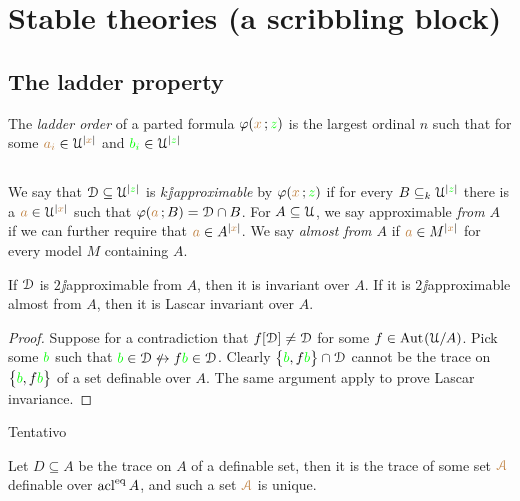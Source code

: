 \documentclass[creche.tex]{subfiles}
\begin{document}
\chapter{Stable theories (a scribbling block)}
\label{stability}
 
\def\medrel#1{\parbox[t]{6ex}{$\displaystyle\hfil #1$}}
\def\ceq#1#2#3{\parbox{25ex}{$\displaystyle #1$}\medrel{#2}$\displaystyle  #3$}

\section{The ladder property}

The \emph{ladder order\/} of a parted formula $\varphi({\color{brown} x}\,;{\color{green} z})$ is the largest ordinal $n$ such that for some ${\color{brown} a_i}\in\EuScript U^{|{\color{brown} x}|}$ and ${\color{green} b_i}\in\EuScript U^{|{\color{green} z}|}$ 


\section{}

We say that $\EuScript D\subseteq\EuScript U^{|{\color{green} z}|}$ is \emph{$k\jj$approximable\/} by $\varphi({\color{brown} x}\,;{\color{green} z})$ if for every $B\subseteq_k\EuScript U^{|{\color{green} z}|}$ there is a ${\color{brown} a}\in\EuScript U^{|{\color{brown} x}|}$ such that $\varphi({\color{brown} a}\,;B)=\EuScript D\cap B$. For $A\subseteq\EuScript U$, we say approximable \emph{from $A$\/} if we can further require that ${\color{brown} a}\in A^{|{\color{brown} x}|}$. We say \emph{almost from $A$\/} if  ${\color{brown} a}\in M^{|{\color{brown} x}|}$ for every model $M$ containing $A$.

\begin{proposition}
If\/ $\EuScript D$ is\/ $2\jj$approximable from $A$, then it is invariant over $A$. If it is\/ $2\jj$ap\-prox\-i\-ma\-ble almost from $A$, then it is Lascar invariant over $A$.
\end{proposition}

\begin{proof}
Suppose for a contradiction that $f[\EuScript D]\neq\EuScript D$ for some $f\in\textrm{Aut\kern.15ex}(\EuScript U/A)$. Pick some ${\color{green} b}$ such that ${\gr b}\in\D\niff f{\gr b}\in\D$. Clearly $\big\{{\color{green} b},f{\color{green} b}\big\}\cap\EuScript D$ cannot be the trace on $\big\{{\color{green} b},f{\color{green} b}\big\}$ of a set definable over $A$. The same argument apply to prove Lascar invariance.
\end{proof}

Tentativo

Let $D\subseteq A$ be the trace on $A$ of a definable set, then it is the trace of some set ${\color{brown}{\EuScript A}}$ definable over $\mathop{\rm acl}^{{\rm eq}} A$, and such a set ${\color{brown}{\EuScript A}}$ is unique.
\end{document}
